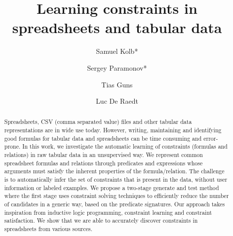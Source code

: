 






\title{Learning constraints in spreadsheets and tabular data}

\author{Samuel Kolb* \and Sergey Paramonov* \and Tias Guns \and Luc De Raedt}

\maketitle

\begin{abstract}
Spreadsheets, CSV (comma separated value) files and other tabular data representations are in wide use today.
However, writing, maintaining and identifying good formulas for tabular data and spreadsheets can be time consuming and error-prone.
In this work, we investigate the automatic learning of constraints (formulas and relations) in raw tabular data in an unsupervised way.
We represent common spreadsheet formulas and relations through predicates and expressions whose arguments must satisfy the inherent properties of the formula/relation. The challenge is to automatically infer the set of constraints that is present in the data, without user information or labeled examples. 
We propose a two-stage generate and test method where the first stage uses constraint solving techniques to efficiently reduce the number of candidates in a generic way, based on the predicate signatures. 
Our approach takes inspiration from inductive logic programming, constraint learning and constraint satisfaction.
We show that we are able to accurately discover constraints in spreadsheets from various sources.
\end{abstract}

